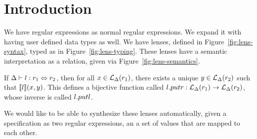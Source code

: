 
\section{Introduction}





We have regular expressions as normal regular expressions.
We expand it with having user defined data types as well.
We have lenses, defined in Figure~\ref{fig:lens-syntax}, typed as in Figure~\ref{fig:lens-typing}.
These lenses have a semantic interpretation as a relation, given via Figure~\ref{fig:lens-semantics}.
\begin{theorem}
\label{thm:lens-bij-fcn}
If $\Delta \vdash l : r_1 \Leftrightarrow r_2$,
then for all $x \in \mathcal{L}_{\Delta}(r_1)$, there exists a unique $y \in \mathcal{L}_{\Delta}(r_2)$ such that $[ \! [l] \! ](x,y)$.
This defines a bijective function called $l.putr : \mathcal{L}_{\Delta}(r_1) \rightarrow \mathcal{L}_{\Delta}(r_2)$,
whose inverse is called $l.putl$.
\end{theorem}
We would like to be able to synthesize these lenses automatically, given a
specification as two regular expressions, an a set of values that are
mapped to each other.
